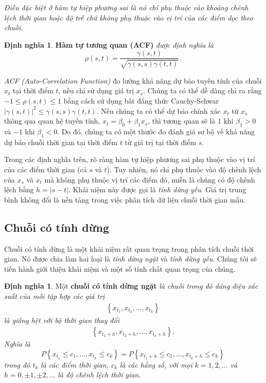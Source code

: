 \documentclass[12pt, a4paper,oneside]{book}
\theoremstyle{definition}
\newtheorem{dn}[theo]{Định nghĩa}
\begin{document}
\textit{Điều đặc biệt ở hàm tự hiệp phương sai là nó chỉ phụ thuộc vào khoảng chênh lệch thời gian hoặc độ trễ chứ không phụ thuộc vào vị trí của các điểm dọc theo chuỗi.}
\begin{dn}\cite{8} \textbf{Hàm tự tương quan (ACF)} \textit{được định nghĩa là
\begin{equation}
\rho(s,t) = \dfrac{\gamma(s,t)}{\sqrt{\gamma(s,s)\gamma(t,t)}}. \label{ct1.13}
\end{equation}}
\end{dn}
\textit{ACF (Auto-Correlation Function)} đo lường khả năng dự báo tuyến tính của chuỗi $x_t$ tại thời điểm $t$, nếu chỉ sử dụng giá trị $x_s$. Chúng ta có thể dễ dàng chỉ ra rằng $-1 \leqslant \rho(s,t)\leqslant 1$ bằng cách sử dụng bất đẳng thức Cauchy-Schwar $\left| \gamma(s,t)\right|^{2}\leqslant\gamma(s,s)\gamma(t,t).$ Nếu chúng ta có thể dự báo chính xác $x_t$ từ $x_s$ thông qua quan hệ tuyến tính, $x_t=\beta_0+\beta_1 x_s$, thì tương quan sẽ là $1$ khi $\beta_1>0$ và $-1$ khi $\beta_1<0$. Do đó, chúng ta có một thước đo đánh giá sơ bộ về khả năng dự báo chuỗi thời gian tại thời điểm $t$ từ giá trị tại thời điểm $s$. 

Trong các định nghĩa trên, rõ ràng hàm tự hiệp phương sai phụ thuộc vào vị trí của các điểm thời gian (cả $s$ và $t$). Tuy nhiên, nó chỉ phụ thuộc vào độ chênh lệch của $x_{s}$ và $x_{t}$ mà không phụ thuộc vị trí các điểm đó, miễn là chúng có độ chênh lệch bằng $h= \lvert s-t\lvert$. Khái niệm này được gọi là \textit{tính dừng yếu}. Giá trị trung bình không đổi là nền tảng trong việc phân tích dữ liệu chuỗi thời gian mẫu.

\subsection{Chuỗi có tính dừng}

Chuỗi có tính dừng là một khái niệm rất quan trọng trong phân tích chuỗi thời gian. Nó được chia làm hai loại là \textit{tính dừng ngặt} và \textit{tính dừng yếu}. Chúng tôi sẽ tiến hành giới thiệu khái niệm và một số tính chất quan trọng của chúng.
\begin{dn}\cite{8, 9} \label{dn1.6}Một \textbf{chuỗi có tính dừng ngặt} \textit{là chuỗi trong đó dáng điệu xác suất của mỗi tập hợp các giá trị
		\begin{align*}
		\left\lbrace x_{t_{1}}, x_{t_{2}}, \dots, x_{t_{k}}\right\rbrace
		\end{align*}
		là giống hệt với bộ thời gian thay đổi
		\begin{align*}
		\left\lbrace x_{t_{1}+h}, x_{t_{2}+h}, \dots, x_{t_{k}+h}\right\rbrace.
		\end{align*}
		Nghĩa là 
		\begin{equation}
		P\left\lbrace x_{t_{1}}\leqslant c_{1}, \dots, x_{t_{k}}\leqslant c_{k}\right\rbrace = P\left\lbrace x_{t_{1}+h}\leqslant c_{1}, \dots, x_{t_{k}+h}\leqslant c_{k}\right\rbrace \label{ct1.19}
		\end{equation}
		trong đó $t_{k}$ là các điểm thời gian, $c_{k}$ là các hằng số, với mọi $k=1, 2, \dots$ và $h=0, \pm1, \pm2, \dots$ là độ chênh lệch thời gian.} 
\end{dn}
\end{document}
